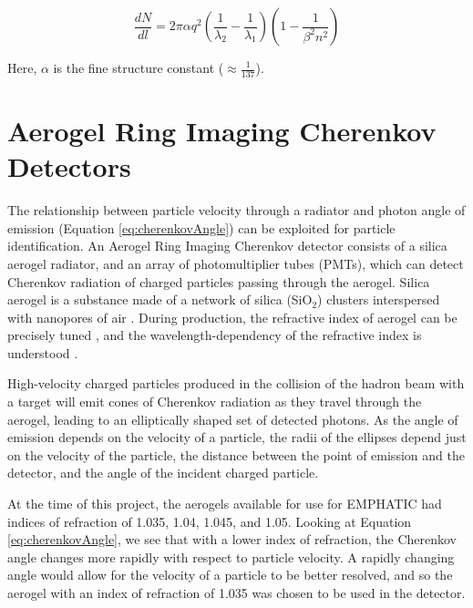 \begin{equation}
    \label{eq:photonNumber}
    \frac{dN}{dl}  = 2\pi\alpha q^2 \left(\frac{1}{\lambda_2} - \frac{1}{\lambda_1}
    \right)\left(1 - \frac{1}{\beta^2n^2}\right)
\end{equation}

Here, $\alpha$ is the fine structure constant ($\approx \frac{1}{137}$).



\section{Aerogel Ring Imaging Cherenkov Detectors}
\label{sec:ARICH}
The relationship between particle velocity through a radiator and photon angle of emission (Equation \ref{eq:cherenkovAngle}) can be exploited for particle identification.
An Aerogel Ring Imaging Cherenkov detector consists of a silica aerogel radiator, and an array of photomultiplier tubes (PMTs), which can detect Cherenkov radiation of charged particles passing through the aerogel.
Silica aerogel is a substance made of a network of silica (SiO$_2$) clusters interspersed with nanopores of air \cite{aerogelRefraction}.
During production, the refractive index of aerogel can be precisely tuned \cite{aerogelRefraction}, and the wavelength-dependency of the refractive index is understood \cite{aerogelWavelength}. 

High-velocity charged particles produced in the collision of the hadron beam with a target will emit cones of Cherenkov radiation as they travel through the aerogel, leading to an elliptically shaped set of detected photons.
As the angle of emission depends on the velocity of a particle, the radii of the ellipses depend just on the velocity of the particle, the distance between the point of emission and the detector, and the angle of the incident charged particle.

At the time of this project, the aerogels available for use for EMPHATIC had indices of refraction of 1.035, 1.04, 1.045, and 1.05.
Looking at Equation \ref{eq:cherenkovAngle}, we see that with a lower index of refraction, the Cherenkov angle changes more rapidly with respect to particle velocity. 
A rapidly changing angle would allow for the velocity of a particle to be better resolved, and so the aerogel with an index of refraction of 1.035 was chosen to be used in the detector.

